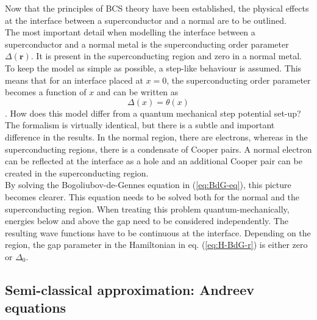 Now that the principles of BCS theory have been established, the physical effects at the interface between a superconductor and a normal are to be outlined.\\
The most important detail when modelling the interface between a superconductor and a normal metal is the superconducting order parameter $\Delta \left( \mathbf{r} \right)$. It is present in the superconducting region and zero in a normal metal. To keep the model as simple as possible, a step-like behaviour is assumed. This means that for an interface placed at $x=0$, the superconducting order parameter becomes a function of $x$ and can be written as
\begin{equation}
\Delta \left( x \right) = \theta \left(x \right)\label{eq:delta }
\end{equation}.
How does this model differ from a quantum mechanical step potential set-up? The formalism is virtually identical, but there is a subtle and important difference in the results. In the normal region, there are electrons, whereas in the superconducting regions, there is a condensate of Cooper pairs. A normal electron can be reflected at the interface as a hole and an additional Cooper pair can be created in the superconducting region.\\
By solving the Bogoliubov-de-Gennes equation in (\ref{eq:BdG-eq}), this picture becomes clearer.  This equation needs to be solved both for the normal and the superconducting region. When treating this problem quantum-mechanically, energies below and above the gap need to be considered independently. The resulting wave functions have to be continuous at the interface. Depending on the region, the gap parameter in the Hamiltonian in eq. (\ref{eq:H-BdG-r}) is either zero or $\Delta_0$.

\subsection*{Semi-classical approximation: Andreev equations}

